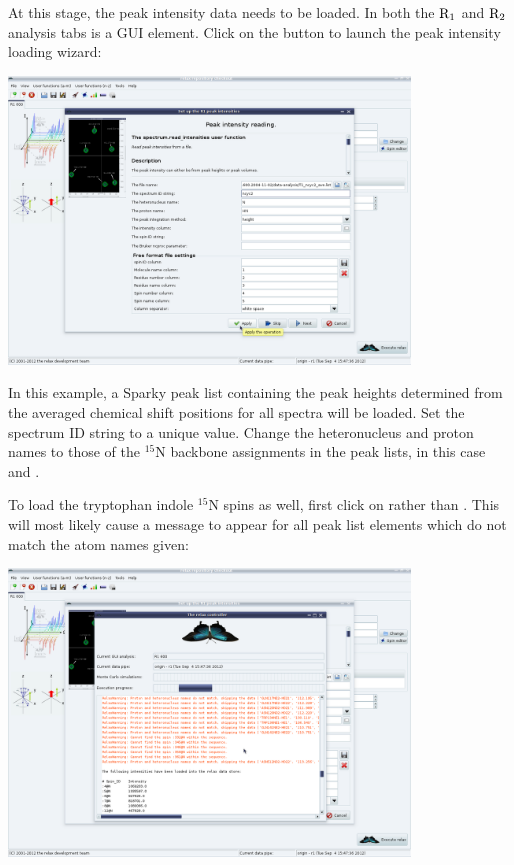 At this stage, the peak intensity data needs to be loaded.  In both the $\mathrm{R}_1$ and $\mathrm{R}_2$ analysis tabs is a  GUI element.  Click on the  button to launch the peak intensity loading wizard:

\begin{minipage}[h]{\linewidth}
\centerline{\includegraphics[width=0.8\textwidth, bb=14 14 1415 1019]{graphics/screenshots/r1_analysis/peak_intensity_bb_peaks}}
\end{minipage}

In this example, a Sparky peak list containing the peak heights determined from the averaged chemical shift positions for all spectra will be loaded.  Set the spectrum ID string to a unique value.  Change the heteronucleus and proton names to those of the $^{15}$N backbone assignments in the peak lists, in this case  and .

To load the tryptophan indole $^{15}$N spins as well, first click on  rather than .  This will most likely cause a  message to appear for all peak list elements which do not match the atom names given:

\begin{minipage}[h]{\linewidth}
\centerline{\includegraphics[width=0.8\textwidth, bb=14 14 1415 1019]{graphics/screenshots/r1_analysis/peak_intensity_warnings}}
\end{minipage}

